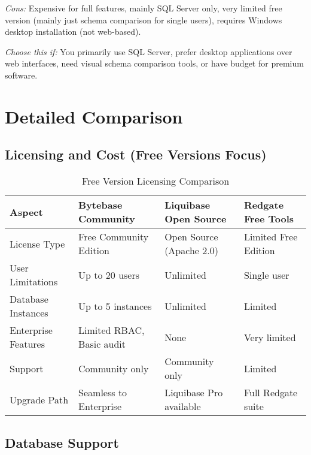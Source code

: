 \documentclass[11pt,a4paper]{article}
\begin{document}
\textit{Cons:} Expensive for full features, mainly SQL Server only, very limited free version (mainly just schema comparison for single users), requires Windows desktop installation (not web-based).

\textit{Choose this if:} You primarily use SQL Server, prefer desktop applications over web interfaces, need visual schema comparison tools, or have budget for premium software.

\newpage
\section{Detailed Comparison}

\subsection{Licensing and Cost (Free Versions Focus)}

\begin{table}[h!]
\centering
\begin{tabularx}{\textwidth}{|X|X|X|X|}
\hline
\textbf{Aspect} & \textbf{Bytebase Community} & \textbf{Liquibase Open Source} & \textbf{Redgate Free Tools} \\
\hline
License Type & Free Community Edition & Open Source (Apache 2.0) & Limited Free Edition \\
\hline
User Limitations & Up to 20 users & Unlimited & Single user \\
\hline
Database Instances & Up to 5 instances & Unlimited & Limited \\
\hline
Enterprise Features & Limited RBAC, Basic audit & None & Very limited \\
\hline
Support & Community only & Community only & Limited \\
\hline
Upgrade Path & Seamless to Enterprise & Liquibase Pro available & Full Redgate suite \\
\hline
\end{tabularx}
\caption{Free Version Licensing Comparison}
\end{table}

\subsection{Database Support}
\end{document}
